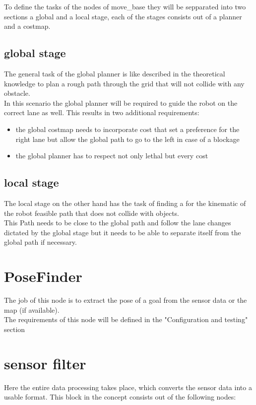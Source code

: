 To define the tasks of the nodes of move\_base they will be sepparated into two sections a global and a local stage, each of the stages consists out of a planner and a costmap.\\
\subsection{global stage}
The general task of the global planner is like described in the theoretical knowledge to plan a rough path through the grid that will not collide with any obstacle.\\

In this scenario the global planner will be required to guide the robot on the correct lane as well. This results in two additional requirements:

\begin{itemize}
	\item the global costmap needs to incorporate cost that set a preference for the right lane but allow the global path to go to the left in case of a blockage
	\item the global planner has to respect not only lethal but every cost
\end{itemize}

\subsection{local stage}
The local stage on the other hand has the task of finding a for the kinematic of the robot feasible path that does not collide with objects.\\
This Path needs to be close to the global path and follow the lane changes dictated by the global stage but it needs to be able to separate itself from the global path if necessary.

\section{PoseFinder}
The job of this node is to extract the pose of a goal from the sensor data or the map (if available).\\

The requirements of this node will be defined in the "Configuration and testing" section
\section{sensor filter}
Here the entire data processing takes place, which converts the sensor data into a usable format. This block in the concept consists out of the following nodes:

